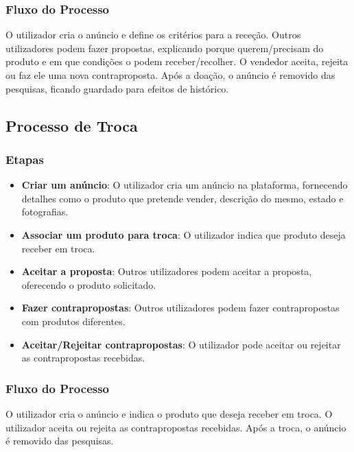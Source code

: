 \documentclass[a4paper, 12pt]{article} %
\begin{document}
\subsubsection{Fluxo do Processo}
O utilizador cria o anúncio e define os critérios para a receção. Outros utilizadores podem fazer propostas, explicando porque querem/precisam do produto e em que condições o podem receber/recolher. O vendedor aceita, rejeita ou faz ele uma nova contraproposta. Após a doação, o anúncio é removido das pesquisas, ficando guardado para efeitos de histórico.

\subsection{Processo de Troca}

\subsubsection{Etapas}
\begin{itemize}
	\item \textbf{Criar um anúncio}: O utilizador cria um anúncio na plataforma, fornecendo detalhes como o produto que pretende vender, descrição do mesmo, estado e fotografias.
	\item \textbf{Associar um produto para troca}: O utilizador indica que produto deseja receber em troca.
	\item \textbf{Aceitar a proposta}: Outros utilizadores podem aceitar a proposta, oferecendo o produto solicitado.
	\item \textbf{Fazer contrapropostas}: Outros utilizadores podem fazer contrapropostas com produtos diferentes.
	\item \textbf{Aceitar/Rejeitar contrapropostas}: O utilizador pode aceitar ou rejeitar as contrapropostas recebidas.
\end{itemize}

\subsubsection{Fluxo do Processo}
O utilizador cria o anúncio e indica o produto que deseja receber em troca. O utilizador aceita ou rejeita as contrapropostas recebidas. Após a troca, o anúncio é removido das pesquisas.
\end{document}
